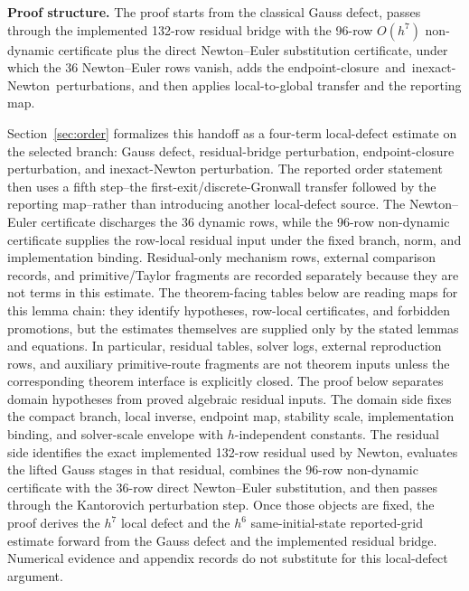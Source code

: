 \documentclass[preprint,12pt]{elsarticle}
\begin{document}
\noindent\textbf{Proof structure.}
The proof starts from the classical Gauss defect, passes through the
implemented 132-row residual bridge with the 96-row
\(O(h^7)\) non-dynamic certificate plus the direct Newton--Euler substitution
certificate, under which the 36 Newton--Euler rows vanish, adds the
\mbox{endpoint-closure and inexact-Newton perturbations}, and then applies
local-to-global transfer and the reporting map.\par\noindent
Section~\ref{sec:order} formalizes this handoff as a
four-term local-defect estimate on the selected branch: Gauss defect,
residual-bridge perturbation, endpoint-closure perturbation, and
inexact-Newton perturbation. The reported order statement then uses a fifth
step--the first-exit/discrete-Gronwall transfer followed by the reporting
map--rather than introducing another local-defect source. The Newton--Euler certificate discharges the 36
dynamic rows, while the 96-row non-dynamic certificate supplies the row-local
residual input under the fixed branch, norm, and implementation binding.
Residual-only mechanism rows, external comparison records, and primitive/Taylor
fragments are recorded separately because they are not terms in this
estimate. The theorem-facing tables below are reading maps for this
lemma chain: they identify hypotheses, row-local certificates, and forbidden
promotions, but the estimates themselves are supplied only by the stated
lemmas and equations. In particular, residual tables, solver logs, external
reproduction rows, and auxiliary primitive-route fragments are not theorem
inputs unless the corresponding theorem interface is explicitly closed.
The proof below separates domain hypotheses from proved algebraic residual
inputs.  The domain side fixes the compact branch, local inverse, endpoint
map, stability scale, implementation binding, and solver-scale envelope with
\(h\)-independent constants.  The residual side identifies the exact
implemented 132-row residual used by Newton, evaluates the lifted Gauss stages
in that residual, combines the 96-row non-dynamic certificate with the
36-row direct Newton--Euler substitution, and then passes through the
Kantorovich perturbation step.  Once those objects are fixed, the proof
derives the \(h^7\) local defect and the \(h^6\) same-initial-state
reported-grid estimate forward from the Gauss defect and the implemented
residual bridge.  Numerical evidence and appendix records do not substitute
for this local-defect argument.
\end{document}
